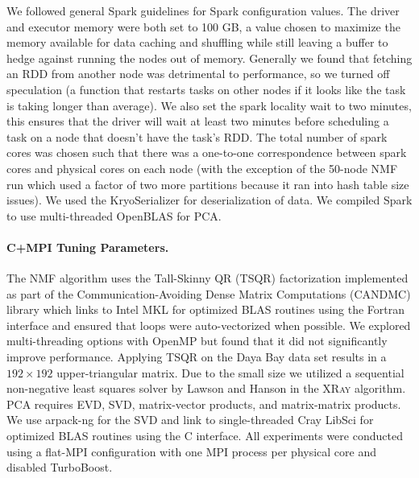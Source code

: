 We followed general Spark guidelines for Spark configuration values. The driver and executor memory were both set to 100 GB, a value chosen to maximize the memory available for data caching and shuffling while still leaving a buffer to hedge against running the nodes out of memory.  Generally we found that fetching an RDD from another node was detrimental to performance, so we turned off speculation (a function that restarts tasks on other nodes if it looks like the task is taking longer than average). We also set the spark locality wait to two minutes, this ensures that the driver will wait at least two minutes before scheduling a task on a node that doesn't have the task's RDD. The total number of spark cores was chosen such that there was a one-to-one correspondence between spark cores and physical cores on each node (with the exception of the 50-node NMF run which used a factor of two more partitions because it ran into hash table size issues). We used the KryoSerializer for deserialization of data. We compiled Spark to use multi-threaded OpenBLAS for PCA.

\paragraph{C+MPI Tuning Parameters.}
The NMF algorithm uses the Tall-Skinny QR (TSQR) \cite{ballard14,demmel12} factorization implemented as part of the Communication-Avoiding Dense Matrix Computations (CANDMC) library \cite{Solomonik14} which links to Intel MKL for optimized BLAS routines using the Fortran interface and ensured that loops were auto-vectorized when possible. We explored multi-threading options with OpenMP but found that it did not significantly improve performance. Applying TSQR on the Daya Bay data set results in a $192 \times 192$ upper-triangular matrix. Due to the small size we utilized a sequential non-negative least squares solver by Lawson and Hanson \cite{lawson95} in the \textsc{XRay} algorithm. PCA requires EVD, SVD, matrix-vector products, and matrix-matrix products. We use arpack-ng \cite{Lehoucq97} for the SVD and link to single-threaded Cray LibSci for optimized BLAS routines using the C interface. All experiments were conducted using a flat-MPI configuration with one MPI process per physical core and disabled TurboBoost.
